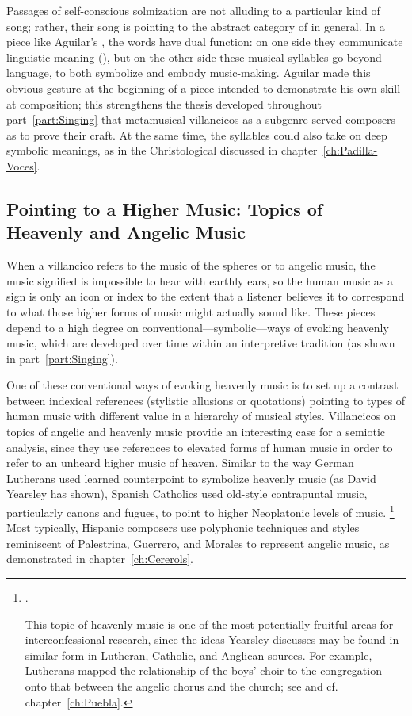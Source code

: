 Passages of self-conscious solmization are not alluding to a particular kind of song; rather, their song is pointing to the abstract category of  in general.
In a piece like Aguilar's , the words have dual function: on one side they communicate linguistic meaning (), but on the other side these musical syllables go beyond language, to both symbolize and embody music-making. 
Aguilar made this obvious gesture at the beginning of a piece intended to demonstrate his own skill at composition; this strengthens the thesis developed throughout part~\ref{part:Singing} that metamusical villancicos as a subgenre served composers as  to prove their craft.
At the same time, the syllables could also take on deep symbolic meanings, as in the Christological  discussed in chapter~\ref{ch:Padilla-Voces}.

\subsection{Pointing to a Higher Music: Topics of Heavenly and Angelic Music}

When a villancico refers to the music of the spheres or to angelic music, the music signified is impossible to hear with earthly ears, so the human music as a sign is only an icon or index to the extent that a listener believes it to correspond to what those higher forms of music might actually sound like.
These pieces depend to a high degree on conventional---symbolic---ways of evoking heavenly music, which are developed over time within an interpretive tradition (as shown in part~\ref{part:Singing}).

One of these conventional ways of evoking heavenly music is to set up a contrast between indexical references (stylistic allusions or quotations) pointing to types of human music with different value in a hierarchy of musical styles.
Villancicos on topics of angelic and heavenly music provide an interesting case for a semiotic analysis, since they use references to elevated forms of human music in order to refer to an unheard higher music of heaven.
Similar to the way German Lutherans used learned counterpoint to symbolize heavenly music (as David Yearsley has shown), Spanish Catholics used old-style contrapuntal music, particularly canons and fugues, to point to higher Neoplatonic levels of music.%
	\footnote{%
\autocites{Yearsley:Buxtehude}{Yearsley:BachThron}.

This topic of heavenly music is one of the most potentially fruitful areas for interconfessional research, since the ideas Yearsley discusses may be found in similar form in Lutheran, Catholic, and Anglican sources. 
For example, Lutherans mapped the relationship of the boys' choir to the congregation onto that between the angelic chorus and the church; see \autocite{Cashner:Gerhardt} and cf. chapter~\ref{ch:Puebla}.
	}
Most typically, Hispanic composers use polyphonic techniques and styles reminiscent of Palestrina, Guerrero, and Morales to represent angelic music, as demonstrated in chapter~\ref{ch:Cererols}.

